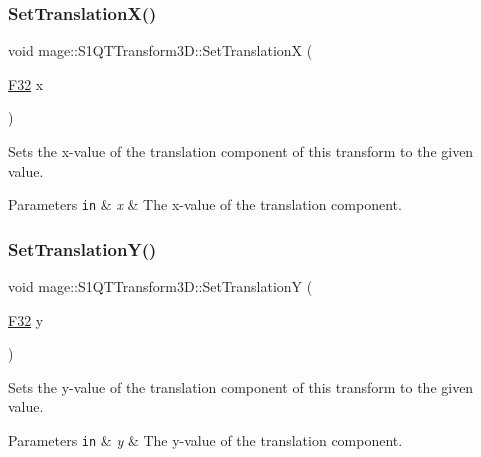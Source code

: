 \subsubsection{\texorpdfstring{Set\+Translation\+X()}{SetTranslationX()}}
{\footnotesize\ttfamily void mage\+::\+S1\+Q\+T\+Transform3\+D\+::\+Set\+TranslationX (\begin{DoxyParamCaption}\item[{\mbox{\hyperlink{namespacemage_aa97e833b45f06d60a0a9c4fc22ae02c0}{F32}}}]{x }\end{DoxyParamCaption})\hspace{0.3cm}{\ttfamily [noexcept]}}

Sets the x-\/value of the translation component of this transform to the given value.


\begin{DoxyParams}[1]{Parameters}
\mbox{\tt in}  & {\em x} & The x-\/value of the translation component. \\
\hline
\end{DoxyParams}
\mbox{\label{classmage_1_1_s1_q_t_transform3_d_a414d7acdd8ea98b66d450e79d69c80ee}} 
\subsubsection{\texorpdfstring{Set\+Translation\+Y()}{SetTranslationY()}}
{\footnotesize\ttfamily void mage\+::\+S1\+Q\+T\+Transform3\+D\+::\+Set\+TranslationY (\begin{DoxyParamCaption}\item[{\mbox{\hyperlink{namespacemage_aa97e833b45f06d60a0a9c4fc22ae02c0}{F32}}}]{y }\end{DoxyParamCaption})\hspace{0.3cm}{\ttfamily [noexcept]}}

Sets the y-\/value of the translation component of this transform to the given value.


\begin{DoxyParams}[1]{Parameters}
\mbox{\tt in}  & {\em y} & The y-\/value of the translation component. \\
\hline
\end{DoxyParams}
\mbox{\label{classmage_1_1_s1_q_t_transform3_d_a2c677cc713ad09333c23efb415186035}} 
